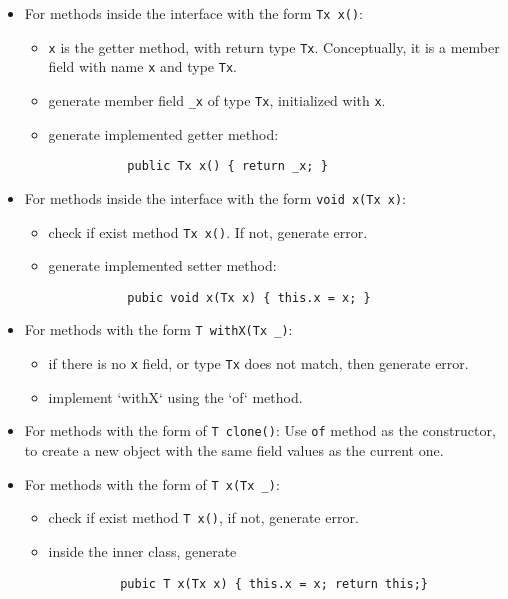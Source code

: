 \begin{itemize}
\item For methods inside the interface with the form \texttt{Tx x()}:
  \begin{itemize}
   \item \texttt{x} is the getter method, with return type
     \texttt{Tx}. Conceptually, it is a member field with name \texttt{x} and
     type \texttt{Tx}.
   \item generate member field \texttt{\_x} of type \texttt{Tx}, initialized
     with \texttt{x}.
   \item generate implemented getter method:
       \begin{lstlisting}
           public Tx x() { return _x; }
       \end{lstlisting}
   \end{itemize}

\item For methods inside the interface with the form \texttt{void x(Tx x)}:
  \begin{itemize}
    \item check if exist method \texttt{Tx x()}. If not, generate error.
    \item generate implemented setter method:
       \begin{lstlisting}
           pubic void x(Tx x) { this.x = x; }
       \end{lstlisting}
    \end{itemize}

\item For methods with the form \texttt{T withX(Tx \_)}:
  \begin{itemize}
  \item if there is no \texttt{x} field, or type \texttt{Tx} does not match,
    then generate error.
  \item implement `withX` using the `of` method.
  \end{itemize}

\item For methods with the form of \texttt{T clone()}: Use \texttt{of} method as
  the constructor, to create a new object with the same field values as the
  current one.

\item For methods with the form of \texttt{T x(Tx \_)}:
  \begin{itemize}
    \item check if exist method \texttt{T x()}, if not, generate error.
    \item inside the inner class, generate
      \begin{lstlisting}
          pubic T x(Tx x) { this.x = x; return this;}
      \end{lstlisting}
  \end{itemize}
\end{itemize}

